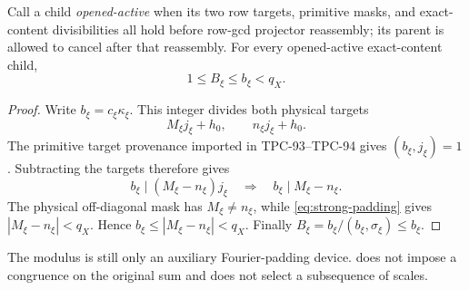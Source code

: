 \begin{lemma}
\label{lem:content-step-below-q}
Call a child \emph{opened-active} when its two row targets, primitive
masks, and exact-content divisibilities all hold before row-gcd
projector reassembly; its parent is allowed to cancel after that
reassembly.  For every opened-active exact-content child,
\[
 1\le B_\xi\le b_\xi<q_X.
\]
\end{lemma}

\begin{proof}
Write \(b_\xi=c_\xi\kappa_\xi\).  This integer divides both
physical targets
\[
 M_\xi j_\xi+h_0,\qquad n_\xi j_\xi+h_0.
\]
The primitive target provenance imported in TPC-93--TPC-94 gives
\((b_\xi,j_\xi)=1\).  Subtracting the targets therefore gives
\[
 b_\xi\mid(M_\xi-n_\xi)j_\xi
 \quad\Longrightarrow\quad
 b_\xi\mid M_\xi-n_\xi.
\]
The physical off-diagonal mask has \(M_\xi\ne n_\xi\), while
\eqref{eq:strong-padding} gives
\(|M_\xi-n_\xi|<q_X\).  Hence
\(b_\xi\le|M_\xi-n_\xi|<q_X\).  Finally
\(B_\xi=b_\xi/(b_\xi,\sigma_\xi)\le b_\xi\).
\end{proof}

\begin{remark}
The modulus is still only an auxiliary Fourier-padding device.
 does not impose a congruence on the
original sum and does not select a subsequence of scales.
\end{remark}
